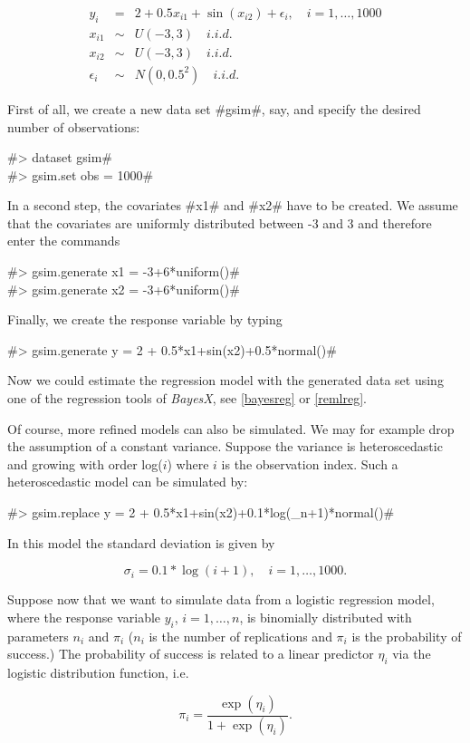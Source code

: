 \begin{eqnarray}
y_i & = & 2 + 0.5 x_{i1} + \sin(x_{i2}) + \epsilon_i, \quad i = 1,\dots,1000 \\
x_{i1} & \sim & U(-3,3) \quad i.i.d.  \\
x_{i2} & \sim & U(-3,3) \quad i.i.d.  \\
\epsilon_i & \sim & N(0,0.5^2) \quad i.i.d.
\end{eqnarray}

First of all, we create a new data set #gsim#, say, and specify
the desired number of observations:

#> dataset gsim# \\
#> gsim.set obs = 1000#

In a second step, the covariates #x1# and #x2# have to be created.
We assume that the covariates are uniformly distributed between -3
and 3 and therefore enter the commands

#> gsim.generate x1 = -3+6*uniform()# \\
#> gsim.generate x2 = -3+6*uniform()#

Finally, we create the response variable by typing

#> gsim.generate y = 2 + 0.5*x1+sin(x2)+0.5*normal()#

Now we could estimate the regression model with the generated data
set using one of the regression tools of {\em BayesX}, see
\autoref{bayesreg} or \autoref{remlreg}.

Of course, more refined models can also be simulated. We may for
example drop the assumption of a constant variance. Suppose the
variance is heteroscedastic and growing with order log($i$) where
$i$ is the observation index. Such a heteroscedastic model can be
simulated by:

#> gsim.replace y = 2 + 0.5*x1+sin(x2)+0.1*log(_n+1)*normal()#

In this model the standard deviation is given by

$$
\sigma_i = 0.1*\log(i+1), \quad  i = 1,\dots,1000.
$$

Suppose now that we want to simulate data from a logistic
regression model, where the response variable $y_i$,
$i=1,\dots,n$, is binomially distributed with parameters $n_i$ and
$\pi_i$ ($n_i$ is the number of replications and $\pi_i$ is the
probability of success.) The probability of success is related to
a linear predictor $\eta_i$ via the logistic distribution
function, i.e.

$$
\pi_i = \frac{\exp(\eta_i)}{1+\exp{(\eta_i)}}.
$$

